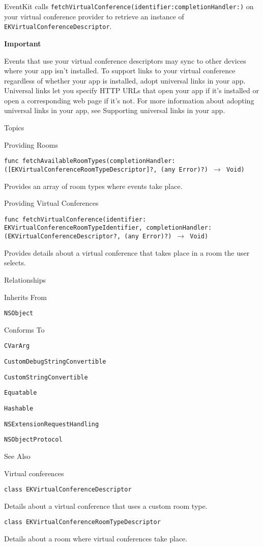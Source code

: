 \documentclass{article}
\begin{document}
EventKit calls \texttt{fetchVirtualConference(identifier:completionHandler:)} on your virtual conference provider to retrieve an instance of \texttt{EKVirtualConferenceDescriptor}.

\textbf{Important}

Events that use your virtual conference descriptors may sync to other devices where your app isn't installed. To support links to your virtual conference regardless of whether your app is installed, adopt universal links in your app. Universal links let you specify HTTP URLs that open your app if it's installed or open a corresponding web page if it's not. For more information about adopting universal links in your app, see Supporting universal links in your app.

Topics

Providing Rooms

\texttt{func fetchAvailableRoomTypes(completionHandler: ([EKVirtualConferenceRoomTypeDescriptor]?, (any Error)?) $\rightarrow$ Void)}

Provides an array of room types where events take place.

Providing Virtual Conferences

\texttt{func fetchVirtualConference(identifier: EKVirtualConferenceRoomTypeIdentifier, completionHandler: (EKVirtualConferenceDescriptor?, (any Error)?) $\rightarrow$ Void)}

Provides details about a virtual conference that takes place in a room the user selects.

Relationships

Inherits From

\texttt{NSObject}

Conforms To

\texttt{CVarArg}

\texttt{CustomDebugStringConvertible}

\texttt{CustomStringConvertible}

\texttt{Equatable}

\texttt{Hashable}

\texttt{NSExtensionRequestHandling}

\texttt{NSObjectProtocol}

See Also

Virtual conferences

\texttt{class EKVirtualConferenceDescriptor}

Details about a virtual conference that uses a custom room type.

\texttt{class EKVirtualConferenceRoomTypeDescriptor}

Details about a room where virtual conferences take place.

\newpage
\end{document}
